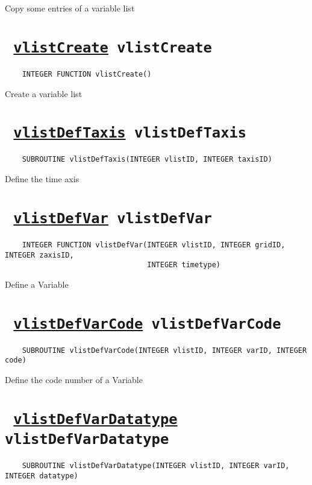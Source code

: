 Copy some entries of a variable list
\ifpdfoutput{}{(\ref{vlistCopyFlag})}


\section*{\texttt{ 
\ifpdf
\hyperref[vlistCreate]{vlistCreate}
\else
vlistCreate
\fi
}}
\begin{verbatim}
    INTEGER FUNCTION vlistCreate()
\end{verbatim}

Create a variable list
\ifpdfoutput{}{(\ref{vlistCreate})}


\section*{\texttt{ 
\ifpdf
\hyperref[vlistDefTaxis]{vlistDefTaxis}
\else
vlistDefTaxis
\fi
}}
\begin{verbatim}
    SUBROUTINE vlistDefTaxis(INTEGER vlistID, INTEGER taxisID)
\end{verbatim}

Define the time axis
\ifpdfoutput{}{(\ref{vlistDefTaxis})}


\section*{\texttt{ 
\ifpdf
\hyperref[vlistDefVar]{vlistDefVar}
\else
vlistDefVar
\fi
}}
\begin{verbatim}
    INTEGER FUNCTION vlistDefVar(INTEGER vlistID, INTEGER gridID, INTEGER zaxisID, 
                                 INTEGER timetype)
\end{verbatim}

Define a Variable
\ifpdfoutput{}{(\ref{vlistDefVar})}


\section*{\texttt{ 
\ifpdf
\hyperref[vlistDefVarCode]{vlistDefVarCode}
\else
vlistDefVarCode
\fi
}}
\begin{verbatim}
    SUBROUTINE vlistDefVarCode(INTEGER vlistID, INTEGER varID, INTEGER code)
\end{verbatim}

Define the code number of a Variable
\ifpdfoutput{}{(\ref{vlistDefVarCode})}


\section*{\texttt{ 
\ifpdf
\hyperref[vlistDefVarDatatype]{vlistDefVarDatatype}
\else
vlistDefVarDatatype
\fi
}}
\begin{verbatim}
    SUBROUTINE vlistDefVarDatatype(INTEGER vlistID, INTEGER varID, INTEGER datatype)
\end{verbatim}

